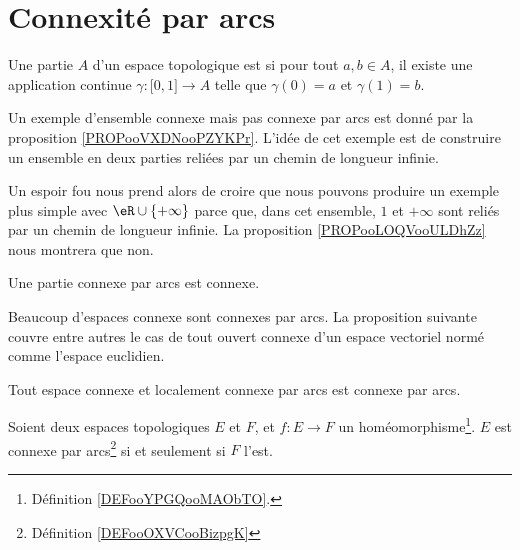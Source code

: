 
\section{Connexité par arcs}

\begin{definition}      \label{DEFooOXVCooBizpgK}
	Une partie \( A\) d'un espace topologique est  si pour tout \( a,b \in A\), il existe une application continue \( \gamma\colon \mathopen[ 0 , 1 \mathclose]\to A\) telle que \( \gamma(0)=a\) et \( \gamma(1)=b\).
\end{definition}

\begin{normaltext}
	Un exemple d'ensemble connexe mais pas connexe par arcs est donné par la proposition \ref{PROPooVXDNooPZYKPr}. L'idée de cet exemple est de construire un ensemble en deux parties reliées par un chemin de longueur infinie.

	Un espoir fou nous prend alors de croire que nous pouvons produire un exemple plus simple avec \( \eR\cup\{ +\infty \}\) parce que, dans cet ensemble, \( 1\) et \( +\infty\) sont reliés par un chemin de longueur infinie. La proposition \ref{PROPooLOQVooULDhZz} nous montrera que non.
\end{normaltext}


\begin{lemma}		\label{LEMooQPYMooRKVSrv}
	Une partie connexe par arcs est connexe.
\end{lemma}

Beaucoup d'espaces connexe sont connexes par arcs. La proposition suivante couvre entre autres le cas de tout ouvert connexe d'un espace vectoriel normé comme l'espace euclidien.

\begin{proposition}       \label{PROPooYFDBooHbBjzF}
	Tout espace connexe et localement connexe par arcs est connexe par arcs.
\end{proposition}


\begin{lemma}       \label{LEMooTVQMooFxrFaT}
	Soient deux espaces topologiques \( E\) et \( F\), et \( f : E\to F\) un homéomorphisme\footnote{Définition \ref{DEFooYPGQooMAObTO}.}. \( E\) est connexe par arcs\footnote{Définition \ref{DEFooOXVCooBizpgK}} si et
	seulement si \( F\) l'est.
\end{lemma}

